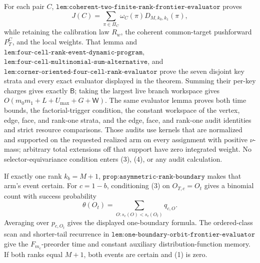 For each pair \(C\), \(\texttt{lem:coherent-two-finite-rank-frontier-evaluator}\) proves
\[
J(C)=\sum_{\pi\in\Pi_C}\omega_C(\pi)D_{M,k_0,k_1}(\pi),
\tag{4}
\]
while retaining the calibration law \(R_w\), the coherent common-target pushforward \(P_T^C\), and the local weights. That lemma and \(\texttt{lem:four-cell-rank-event-dynamic-program}\), \(\texttt{lem:four-cell-multinomial-sum-alternative}\), and \(\texttt{lem:corner-oriented-four-cell-rank-evaluator}\) prove the seven disjoint key strata and every exact evaluator displayed in the theorem. Summing their per-key charges gives exactly \(\mathsf B\); taking the largest live branch workspace gives \(O(m_0m_1+L+U_{\max}+G+\mathsf W)\). The same evaluator lemma proves both time bounds, the factorial-trigger condition, the constant workspace of the vertex, edge, face, and rank-one strata, and the edge, face, and rank-one audit identities and strict resource comparisons. Those audits use kernels that are normalized and supported on the requested realized arm on every assignment with positive \(\nu\)-mass; arbitrary total extensions off that support have zero integrated weight. No selector-equivariance condition enters (3), (4), or any audit calculation.

If exactly one rank \(k_b=M+1\), \(\texttt{prop:asymmetric-rank-boundary}\) makes that arm's event certain. For \(c=1-b\), conditioning (3) on \(O_{T,c}=O_t\) gives a binomial count with success probability
\[
\theta(O_t)=\sum_{O:s_c(O)<s_c(O_t)}q_{c,O}.
\]
Averaging over \(p_{c,O_t}\) gives the displayed one-boundary formula. The ordered-class scan and shorter-tail recurrence in \(\texttt{lem:one-boundary-orbit-frontier-evaluator}\) give the \(F_{m_c}\)-preorder time and constant auxiliary distribution-function memory. If both ranks equal \(M+1\), both events are certain and (1) is zero.

